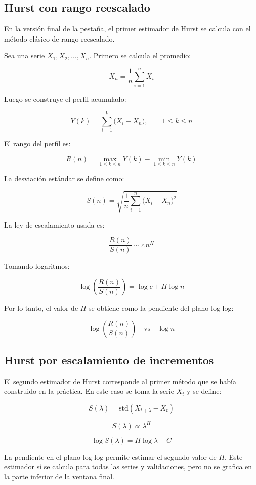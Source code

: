 \documentclass[12pt,a4paper]{article}
\begin{document}
\subsection{Hurst con rango reescalado}

En la versión final de la pestaña, el primer estimador de Hurst se calcula con el método clásico de rango reescalado.

Sea una serie \(X_1, X_2, \dots, X_n\). Primero se calcula el promedio:

\[
\bar X_n = \frac{1}{n}\sum_{i=1}^{n} X_i
\]

Luego se construye el perfil acumulado:

\[
Y(k)=\sum_{i=1}^{k}\bigl(X_i-\bar X_n\bigr), \qquad 1\le k\le n
\]

El rango del perfil es:

\[
R(n)=\max_{1\le k\le n} Y(k)-\min_{1\le k\le n} Y(k)
\]

La desviación estándar se define como:

\[
S(n)=\sqrt{\frac{1}{n}\sum_{i=1}^{n}\bigl(X_i-\bar X_n\bigr)^2}
\]

La ley de escalamiento usada es:

\[
\frac{R(n)}{S(n)} \sim c\, n^H
\]

Tomando logaritmos:

\[
\log\!\left(\frac{R(n)}{S(n)}\right)=\log c + H \log n
\]

Por lo tanto, el valor de \(H\) se obtiene como la pendiente del plano log-log:

\[
\log\!\left(\frac{R(n)}{S(n)}\right)
\quad \text{vs} \quad
\log n
\]

\subsection{Hurst por escalamiento de incrementos}

El segundo estimador de Hurst corresponde al primer método que se había construido en la práctica. En este caso se toma la serie \(X_t\) y se define:

\[
S(\lambda)=\mathrm{std}(X_{t+\lambda}-X_t)
\]

\[
S(\lambda)\propto \lambda^H
\]

\[
\log S(\lambda)= H \log \lambda + C
\]

La pendiente en el plano log-log permite estimar el segundo valor de \(H\). Este estimador sí se calcula para todas las series y validaciones, pero no se grafica en la parte inferior de la ventana final.
\end{document}
